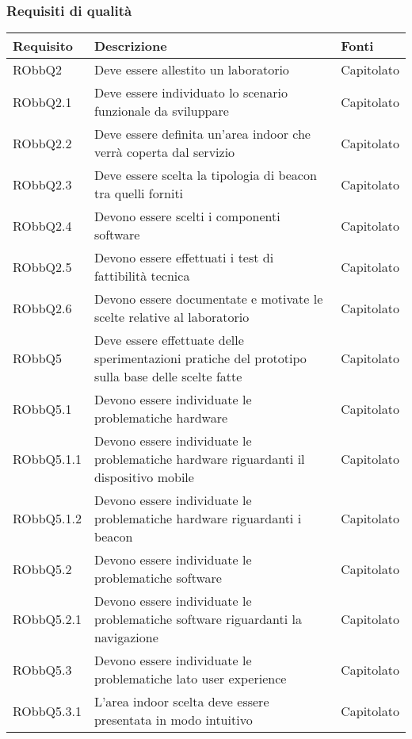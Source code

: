 \documentclass[../AnalisiDeiRequisiti.tex]{subfiles}
\begin{document}
\subsubsection{Requisiti di qualità}
\begin{longtabu} to \textwidth {X X[2] X}
	\toprule
	\textbf{Requisito} & \textbf{Descrizione} & \textbf{Fonti}\\
	\midrule
	\endhead
	RObbQ2 & Deve essere allestito un laboratorio & Capitolato \\ 
	\midrule 
	RObbQ2.1 & Deve essere individuato lo scenario funzionale da sviluppare & Capitolato \\ 
	\midrule 
	RObbQ2.2 & Deve essere definita un'area indoor che verrà coperta dal servizio & Capitolato \\ 
	\midrule 
	RObbQ2.3 & Deve essere scelta la tipologia di beacon tra quelli forniti & Capitolato \\ 
	\midrule 
	RObbQ2.4 & Devono essere scelti i componenti software & Capitolato \\ 
	\midrule 
	RObbQ2.5 & Devono essere effettuati i test di fattibilità tecnica & Capitolato \\ 
	\midrule 
	RObbQ2.6 & Devono essere documentate e motivate le scelte relative al laboratorio & Capitolato \\ 
	\midrule 
	RObbQ5 & Deve essere effettuate delle sperimentazioni pratiche del prototipo sulla base delle scelte fatte & Capitolato \\ 
	\midrule 
	RObbQ5.1 & Devono essere individuate le problematiche hardware & Capitolato \\ 
	\midrule 
	RObbQ5.1.1 & Devono essere individuate le problematiche hardware riguardanti il dispositivo mobile & Capitolato \\ 
	\midrule 
	RObbQ5.1.2 & Devono essere individuate le problematiche hardware riguardanti i beacon & Capitolato \\ 
	\midrule 
	RObbQ5.2 & Devono essere individuate le problematiche software & Capitolato \\ 
	\midrule 
	RObbQ5.2.1 & Devono essere individuate le problematiche software riguardanti la navigazione & Capitolato \\ 
	\midrule 
	RObbQ5.3 & Devono essere individuate le problematiche lato user experience & Capitolato \\ 
	\midrule 
	RObbQ5.3.1 & L'area indoor scelta deve essere presentata in modo intuitivo  & Capitolato \\ 
	\midrule 

\end{longtabu}
\end{document}
